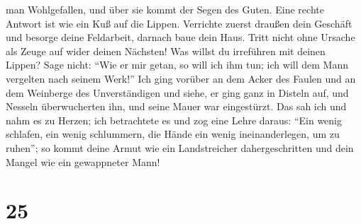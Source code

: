 man Wohlgefallen, und über sie kommt der Segen des Guten.
 Eine rechte Antwort ist wie ein Kuß auf die Lippen.
 Verrichte zuerst draußen dein Geschäft und besorge deine
Feldarbeit, darnach baue dein Haus.  Tritt nicht ohne
Ursache als Zeuge auf wider deinen Nächsten! Was willst du irreführen
mit deinen Lippen?  Sage nicht: ``Wie er mir getan, so
will ich ihm tun; ich will dem Mann vergelten nach seinem Werk!''
 Ich ging vorüber an dem Acker des Faulen und an dem
Weinberge des Unverständigen  und siehe, er ging ganz in
Disteln auf, und Nesseln überwucherten ihn, und seine Mauer war
eingestürzt.  Das sah ich und nahm es zu Herzen; ich
betrachtete es und zog eine Lehre daraus:  ``Ein wenig
schlafen, ein wenig schlummern, die Hände ein wenig ineinanderlegen, um
zu ruhen'';  so kommt deine Armut wie ein Landstreicher
dahergeschritten und dein Mangel wie ein gewappneter Mann!

\hypertarget{section-24}{%
\section{25}\label{section-24}}

